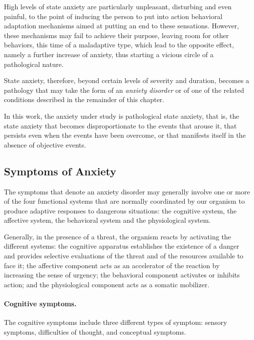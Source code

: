 High levels of state anxiety are particularly unpleasant, disturbing and even
painful, to the point of inducing the person to put into action behavioral
adaptation mechanisms aimed at putting an end to these sensations. However, these
mechanisms may fail to achieve their purpose, leaving room for other behaviors,
this time of a maladaptive type, which lead to the opposite effect, namely a
further increase of anxiety, thus starting a vicious circle of a pathological
nature.

State anxiety, therefore, beyond certain levels of severity and duration, becomes
a pathology that may take the form of an \emph{anxiety disorder} or of one of the
related conditions described in the remainder of this chapter.

In this work, the anxiety under study is pathological state anxiety, that is, the
state anxiety that becomes disproportionate to the events that arouse it, that
persists even when the events have been overcome, or that manifests itself in the
absence of objective events.

\subsection{Symptoms of Anxiety}

The symptoms that denote an anxiety disorder may generally involve one or more of
the four functional systems that are normally coordinated by our organism to
produce adaptive responses to dangerous situations: the cognitive system, the
affective system, the behavioral system and the physiological system.

Generally, in the presence of a threat, the organism reacts by activating the
different systems: the cognitive apparatus establishes the existence of a danger
and provides selective evaluations of the threat and of the resources available
to face it; the affective component acts as an accelerator of the reaction by
increasing the sense of urgency; the behavioral component activates or inhibits
action; and the physiological component acts as a somatic mobilizer.

\paragraph{Cognitive symptoms.}
The cognitive symptoms include three different types of symptom: sensory
symptoms, difficulties of thought, and conceptual symptoms.

